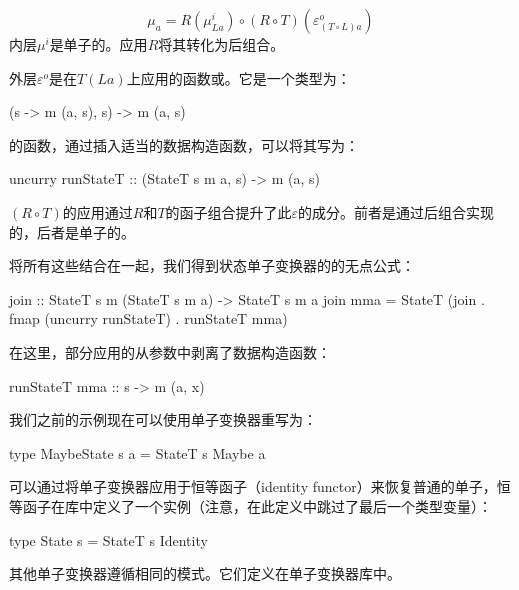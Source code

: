 \documentclass[DaoFP]{subfiles}
\begin{document}
    \[ \mu_a = R(\mu^i_{L a}) \circ (R \circ T) (\varepsilon^o_{(T\circ L) a})\]
    内层$\mu^i$是单子的。应用$R$将其转化为后组合。

    外层$\varepsilon^o$是在$T(L a)$上应用的函数或。它是一个类型为：
    \begin{haskell}
        (s -> m (a, s), s) -> m (a, s)
    \end{haskell}
    的函数，通过插入适当的数据构造函数，可以将其写为：
    \begin{haskell}
        uncurry runStateT :: (StateT s m a, s) -> m (a, s)
    \end{haskell}
    $(R \circ T)$的应用通过$R$和$T$的函子组合提升了此$\varepsilon$的成分。前者是通过后组合实现的，后者是单子的。

    将所有这些结合在一起，我们得到状态单子变换器的的无点公式：
    \begin{haskell}
        join :: StateT s m (StateT s m a) -> StateT s m a
        join mma = StateT (join . fmap (uncurry runStateT) . runStateT mma)
    \end{haskell}
    在这里，部分应用的从参数中剥离了数据构造函数：
    \begin{haskell}
        runStateT mma :: s -> m (a, x)
    \end{haskell}

    我们之前的示例现在可以使用单子变换器重写为：
    \begin{haskell}
        type MaybeState s a = StateT s Maybe a
    \end{haskell}

    可以通过将单子变换器应用于恒等函子（identity functor）来恢复普通的单子，恒等函子在库中定义了一个实例（注意，在此定义中跳过了最后一个类型变量）：
    \begin{haskell}
        type State s = StateT s Identity
    \end{haskell}

    其他单子变换器遵循相同的模式。它们定义在单子变换器库中。
\end{document}
